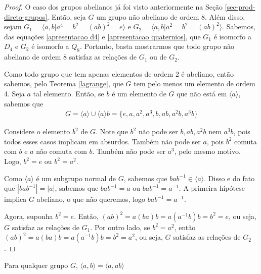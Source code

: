 	\begin{proof}
		O caso dos grupos abelianos já foi visto anteriormente na Seção \ref{sec-prod-direto-grupos}. 
		Então, seja $G$ um grupo não abeliano de ordem 8. Além disso, sejam 
		$G_1 = \langle a,b | a^4 = b^2 =(ab)^2 = e \rangle$ e $G_2 = \langle a,b | a^2 = b^2 = (ab)^2 \rangle$.
		Sabemos, das equações \eqref{apresentacao d4} e \eqref{apresentacao quaternios}, que $G_1$ 
		é isomorfo a $D_4$ e $G_2$ é isomorfo a $Q_8$. Portanto, basta mostrarmos que todo grupo não abeliano 
		de ordem 8 satisfaz as relações de $G_1$ ou de $G_2$. 
		
		\par\vspace{0.3cm} Como todo grupo que tem apenas elementos de ordem 2 é abeliano,
		então sabemos, pelo Teorema \eqref{lagrange}, que $G$ tem pelo menos um elemento de ordem 4. 
		Seja $a$ tal elemento. Então, se $b$ é um elemento de $G$ que não está em $\langle a \rangle$, 
		sabemos que 
		\begin{align*}
		    G = \langle a \rangle\cup\langle a \rangle b = \{e, a, a^2, a^3, b, ab, a^2b, a^3b\}
		\end{align*}
		\par\vspace{0.3cm} Considere o elemento $b^2$ de $G$. Note que $b^2$ não pode ser $b, ab, a^2b$ 
		nem $a^3b$, pois todos esses casos implicam em absurdos. Também não pode ser $a$, pois $b^2$ 
		comuta com $b$ e $a$ não comuta com $b$. Também não pode ser $a^3$, pelo mesmo motivo. 
		Logo, $b^2 = e$ ou $b^2 = a^2$. 
		
		\par\vspace{0.3cm} Como $\langle a \rangle$ é um subgrupo normal de $G$, sabemos que 
		$bab^{-1}\in\langle a \rangle$. Disso e do fato que $|bab^{-1}| = |a|$, sabemos que $bab^{-1} = a$ 
		ou $bab^{-1} = a^{-1}$. A primeira hipótese implica $G$ abeliano, o que não queremos, 
		logo $bab^{-1} = a^{-1}$.
		
		\par\vspace{0.3cm} Agora, suponha $b^2 = e$. Então, $(ab)^2 = a(ba)b = a(a^{-1}b)b = b^2 = e$, 
		ou seja, $G$ satisfaz as relações de $G_1$. Por outro lado, se $b^2 = a^2$, então 
		$(ab)^2 = a(ba)b = a(a^{-1}b)b = b^2 = a^2$, ou seja, $G$ satisfaz as relações de $G_2$.
	\end{proof}
	\begin{lemma}
	\label{lema geradores}
		Para qualquer grupo $G$, $\langle a,b \rangle = \langle a,ab \rangle$
	\end{lemma}
